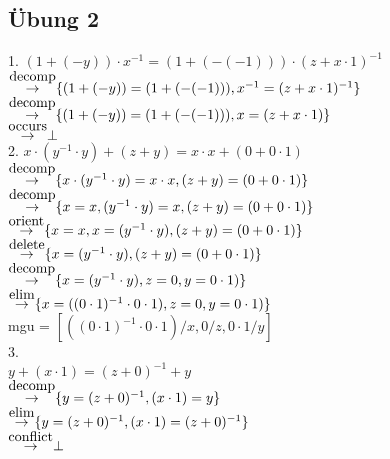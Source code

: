\documentclass{article}
\begin{document}
	\subsection{Übung 2}
	1. $(1+(-y))\cdot x^{-1} = (1+(-(-1)))\cdot (z+x\cdot 1)^{-1}$\\
	$\stackon{$\to$}{decomp}\{(1+(-y))=(1+(-(-1))), x^{-1}=(z+x\cdot 1)^{-1}\}$\\
	$\stackon{$\to$}{decomp} \{(1+(-y))=(1+(-(-1))), x=(z+x\cdot 1)\}$\\
	$\stackon{$\to$}{occurs} \bot$\\
	2. $x\cdot (y^{-1}\cdot y)+(z+y) = x\cdot x +(0+0\cdot 1)$\\
	$\stackon{$\to$}{decomp} \{x\cdot (y^{-1}\cdot y)=x\cdot x, (z+y)=(0+0\cdot 1)\}$\\
	$\stackon{$\to$}{decomp} \{x=x,(y^{-1}\cdot y)=x,  (z+y)=(0+0\cdot 1)\}$\\
	$\stackon{$\to$}{orient} \{x=x,x=(y^{-1}\cdot y),  (z+y)=(0+0\cdot 1)\}$\\
	$\stackon{$\to$}{delete} \{x=(y^{-1}\cdot y),  (z+y)=(0+0\cdot 1)\}$\\
	$\stackon{$\to$}{decomp} \{x=(y^{-1}\cdot y),  z=0,y=0\cdot 1)\}$\\
	$\stackon{$\to$}{elim} \{x=((0\cdot 1)^{-1}\cdot 0\cdot 1),  z=0,y=0\cdot 1)\}$\\
	mgu = $[((0\cdot 1)^{-1}\cdot 0\cdot 1)/x,0/z,0\cdot 1/y]$\\
	3.\\
	$y+(x\cdot 1)= (z+0)^{-1} +y$\\
	$\stackon{$\to$}{decomp} \{y=(z+0)^{-1},(x\cdot 1)=y\}$\\
	$\stackon{$\to$}{elim}\{y=(z+0)^{-1},(x\cdot 1)=(z+0)^{-1}\}$\\
	$\stackon{$\to$}{conflict}\bot$
\end{document}
